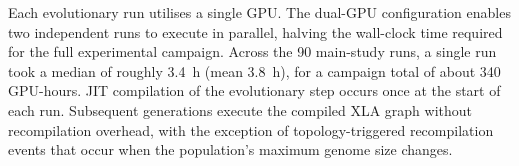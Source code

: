 \documentclass[12pt]{article}
\begin{document}
Each evolutionary run utilises a single GPU.
The dual-GPU configuration enables two independent runs to execute in parallel, halving the wall-clock time required for the full experimental campaign.
Across the 90 main-study runs, a single run took a median of roughly 3.4~h (mean 3.8~h), for a campaign total of about 340 GPU-hours.
JIT compilation of the evolutionary step occurs once at the start of each run. Subsequent generations execute the compiled XLA graph without recompilation overhead, with the exception of topology-triggered recompilation events that occur when the population's maximum genome size changes.






\end{document}
